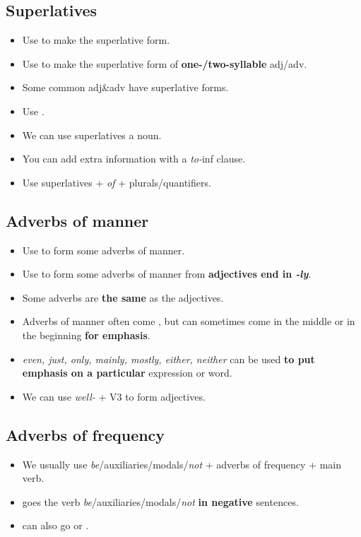 \subsection{Superlatives}
\begin{itemize}
    \item Use  to make the superlative form.
    \item Use  to make the superlative form of \textbf{one-/two-syllable} adj/adv.
    \item Some common adj\&adv have  superlative forms.
    \item Use .
    \item We can use superlatives  a noun.
    \item[\doot] You can add extra information with a \textit{to-}inf clause.
    \item[\aast] Use superlatives + \textit{of} + plurals/quantifiers.
\end{itemize}

\subsection{Adverbs of manner}
\begin{itemize}
    \item Use  to form some adverbs of manner.
    \item Use  to form some adverbs of manner from \textbf{adjectives end in \textit{-ly}}.
    \item Some adverbs are \textbf{the same} as the adjectives.
    \item[\doot] Adverbs of manner often come ,
    but can sometimes come in the middle or in the beginning \textbf{for emphasis}.
    \item[\doot] \textit{even, just, only, mainly, mostly, either, neither}
    can be used \textbf{to put emphasis on a particular} expression or word.
    \item[\aast] We can use \textit{well-} + V3 to form adjectives.
\end{itemize}

\subsection{Adverbs of frequency}
\begin{itemize}
    \item We usually use \textit{be}/auxiliaries/modals/\textit{not} + adverbs of frequency + main verb.
    \item[\doot]  goes
     the verb \textit{be}/auxiliaries/modals/\textit{not} \textbf{in negative} sentences.
    \item[\doot] 
    can also go  or .
\end{itemize}

